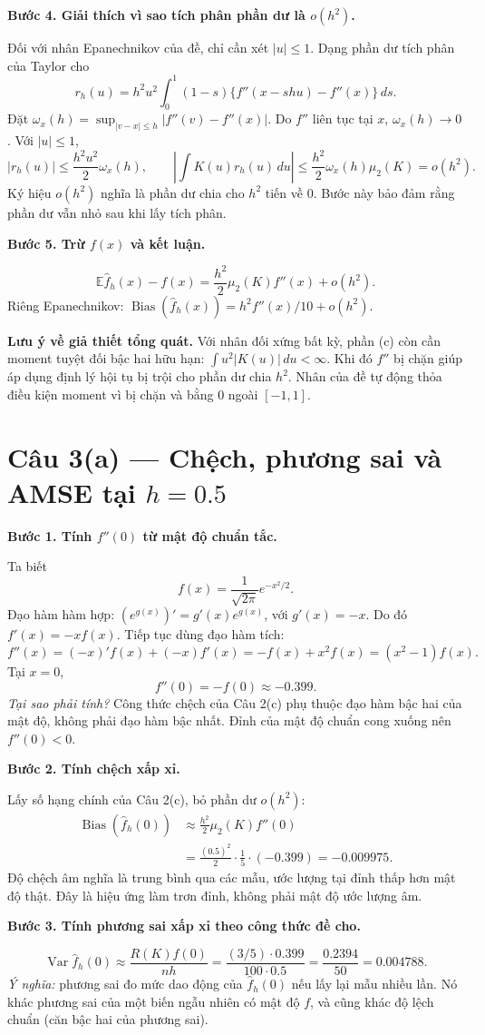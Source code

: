 \documentclass[11pt,a4paper]{article}
\newcommand{\E}{\mathbb E}
\newcommand{\fh}{\widehat f_h}
\DeclareMathOperator{\Var}{Var}
\DeclareMathOperator{\Bias}{Bias}
\newcommand{\buoc}[1]{\par\medskip\textbf{#1}\par}
\begin{document}
\buoc{Bước 4. Giải thích vì sao tích phân phần dư là $o(h^2)$.}
Đối với nhân Epanechnikov của đề, chỉ cần xét $|u|\leq1$. Dạng phần dư tích phân của Taylor cho
\[
r_h(u)=h^2u^2\int_0^1(1-s)\{f''(x-shu)-f''(x)\}\,ds.
\]
Đặt $\omega_x(h)=\sup_{|v-x|\leq h}|f''(v)-f''(x)|$. Do $f''$ liên tục tại $x$, $\omega_x(h)\to0$. Với $|u|\leq1$,
\[
|r_h(u)|\leq\frac{h^2u^2}{2}\omega_x(h),\qquad
\left|\int K(u)r_h(u)\,du\right|
\leq\frac{h^2}{2}\omega_x(h)\mu_2(K)=o(h^2).
\]
Ký hiệu $o(h^2)$ nghĩa là phần dư chia cho $h^2$ tiến về 0. Bước này bảo đảm rằng phần dư vẫn nhỏ sau khi lấy tích phân.

\buoc{Bước 5. Trừ $f(x)$ và kết luận.}
\[
\boxed{\E\fh(x)-f(x)=\frac{h^2}{2}\mu_2(K)f''(x)+o(h^2).}
\]
Riêng Epanechnikov: $\Bias(\fh(x))=h^2f''(x)/10+o(h^2)$.

\textbf{Lưu ý về giả thiết tổng quát.} Với nhân đối xứng bất kỳ, phần (c) còn cần moment tuyệt đối bậc hai hữu hạn: $\int u^2|K(u)|\,du<\infty$. Khi đó $f''$ bị chặn giúp áp dụng định lý hội tụ bị trội cho phần dư chia $h^2$. Nhân của đề tự động thỏa điều kiện moment vì bị chặn và bằng 0 ngoài $[-1,1]$.

\clearpage
\section*{Câu 3(a) — Chệch, phương sai và AMSE tại $h=0.5$}
\buoc{Bước 1. Tính $f''(0)$ từ mật độ chuẩn tắc.}
Ta biết
\[
f(x)=\frac1{\sqrt{2\pi}}e^{-x^2/2}.
\]
Đạo hàm hàm hợp: $(e^{g(x)})'=g'(x)e^{g(x)}$, với $g'(x)=-x$. Do đó $f'(x)=-xf(x)$. Tiếp tục dùng đạo hàm tích:
\[
f''(x)=(-x)'f(x)+(-x)f'(x)
=-f(x)+x^2f(x)=(x^2-1)f(x).
\]
Tại $x=0$,
\[
\boxed{f''(0)=-f(0)\approx-0.399.}
\]
\textit{Tại sao phải tính?} Công thức chệch của Câu 2(c) phụ thuộc đạo hàm bậc hai của mật độ, không phải đạo hàm bậc nhất. Đỉnh của mật độ chuẩn cong xuống nên $f''(0)<0$.

\buoc{Bước 2. Tính chệch xấp xỉ.}
Lấy số hạng chính của Câu 2(c), bỏ phần dư $o(h^2)$:
\begin{align*}
\Bias(\fh(0))&\approx\frac{h^2}{2}\mu_2(K)f''(0)\\
&=\frac{(0.5)^2}{2}\cdot\frac15\cdot(-0.399)
=\boxed{-0.009975}.
\end{align*}
Độ chệch âm nghĩa là trung bình qua các mẫu, ước lượng tại đỉnh thấp hơn mật độ thật. Đây là hiệu ứng làm trơn đỉnh, không phải mật độ ước lượng âm.

\buoc{Bước 3. Tính phương sai xấp xỉ theo công thức đề cho.}
\[
\Var\fh(0)\approx\frac{R(K)f(0)}{nh}
=\frac{(3/5)\cdot0.399}{100\cdot0.5}
=\frac{0.2394}{50}=\boxed{0.004788}.
\]
\textit{Ý nghĩa:} phương sai đo mức dao động của $\fh(0)$ nếu lấy lại mẫu nhiều lần. Nó khác phương sai của một biến ngẫu nhiên có mật độ $f$, và cũng khác độ lệch chuẩn (căn bậc hai của phương sai).
\end{document}
